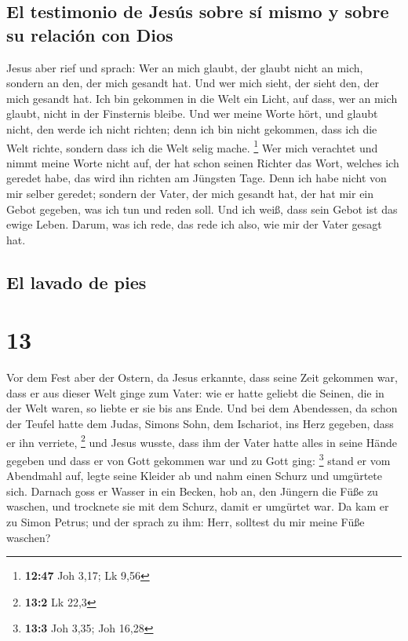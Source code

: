 \hypertarget{el-testimonio-de-jesuxfas-sobre-suxed-mismo-y-sobre-su-relaciuxf3n-con-dios}{%
\subsection{El testimonio de Jesús sobre sí mismo y sobre su relación
con
Dios}\label{el-testimonio-de-jesuxfas-sobre-suxed-mismo-y-sobre-su-relaciuxf3n-con-dios}}

 Jesus aber rief und sprach: Wer an mich glaubt, der
glaubt nicht an mich, sondern an den, der mich gesandt hat.
 Und wer mich sieht, der sieht den, der mich gesandt hat.
 Ich bin gekommen in die Welt ein Licht, auf dass, wer an
mich glaubt, nicht in der Finsternis bleibe.  Und wer
meine Worte hört, und glaubt nicht, den werde ich nicht richten; denn
ich bin nicht gekommen, dass ich die Welt richte, sondern dass ich die
Welt selig mache. \footnote{\textbf{12:47} Joh 3,17; Lk 9,56}
 Wer mich verachtet und nimmt meine Worte nicht auf, der
hat schon seinen Richter das Wort, welches ich geredet habe, das wird
ihn richten am Jüngsten Tage.  Denn ich habe nicht von
mir selber geredet; sondern der Vater, der mich gesandt hat, der hat mir
ein Gebot gegeben, was ich tun und reden soll.  Und ich
weiß, dass sein Gebot ist das ewige Leben. Darum, was ich rede, das rede
ich also, wie mir der Vater gesagt hat.

\hypertarget{el-lavado-de-pies}{%
\subsection{El lavado de pies}\label{el-lavado-de-pies}}

\hypertarget{section-12}{%
\section{13}\label{section-12}}

 Vor dem Fest aber der Ostern, da Jesus erkannte, dass
seine Zeit gekommen war, dass er aus dieser Welt ginge zum Vater: wie er
hatte geliebt die Seinen, die in der Welt waren, so liebte er sie bis
ans Ende.  Und bei dem Abendessen, da schon der Teufel
hatte dem Judas, Simons Sohn, dem Ischariot, ins Herz gegeben, dass er
ihn verriete, \footnote{\textbf{13:2} Lk 22,3}  und Jesus
wusste, dass ihm der Vater hatte alles in seine Hände gegeben und dass
er von Gott gekommen war und zu Gott ging: \footnote{\textbf{13:3} Joh
  3,35; Joh 16,28}  stand er vom Abendmahl auf, legte
seine Kleider ab und nahm einen Schurz und umgürtete sich.
 Darnach goss er Wasser in ein Becken, hob an, den Jüngern
die Füße zu waschen, und trocknete sie mit dem Schurz, damit er umgürtet
war.  Da kam er zu Simon Petrus; und der sprach zu ihm:
Herr, solltest du mir meine Füße waschen?

